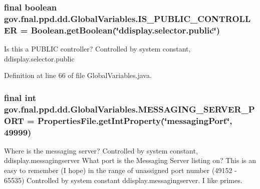 \hypertarget{classgov_1_1fnal_1_1ppd_1_1dd_1_1GlobalVariables_a01fec82f5b2996d3e0c41c1f52d884a0}{
\subsubsection[{I\-S\-\_\-\-P\-U\-B\-L\-I\-C\-\_\-\-C\-O\-N\-T\-R\-O\-L\-L\-E\-R}]{\setlength{\rightskip}{0pt plus 5cm}final boolean gov.\-fnal.\-ppd.\-dd.\-Global\-Variables.\-I\-S\-\_\-\-P\-U\-B\-L\-I\-C\-\_\-\-C\-O\-N\-T\-R\-O\-L\-L\-E\-R = Boolean.\-get\-Boolean(\char`\"{}ddisplay.\-selector.\-public\char`\"{})\hspace{0.3cm}{\ttfamily [static]}}}\label{classgov_1_1fnal_1_1ppd_1_1dd_1_1GlobalVariables_a01fec82f5b2996d3e0c41c1f52d884a0}
Is this a P\-U\-B\-L\-I\-C controller? Controlled by system constant, ddisplay.\-selector.\-public 

Definition at line 66 of file Global\-Variables.\-java.

\hypertarget{classgov_1_1fnal_1_1ppd_1_1dd_1_1GlobalVariables_a3afb8f4fd1dbbc82329ea9ff4aa3629e}{
\subsubsection[{M\-E\-S\-S\-A\-G\-I\-N\-G\-\_\-\-S\-E\-R\-V\-E\-R\-\_\-\-P\-O\-R\-T}]{\setlength{\rightskip}{0pt plus 5cm}final int gov.\-fnal.\-ppd.\-dd.\-Global\-Variables.\-M\-E\-S\-S\-A\-G\-I\-N\-G\-\_\-\-S\-E\-R\-V\-E\-R\-\_\-\-P\-O\-R\-T = {\bf Properties\-File.\-get\-Int\-Property}(\char`\"{}messaging\-Port\char`\"{}, 49999)\hspace{0.3cm}{\ttfamily [static]}}}\label{classgov_1_1fnal_1_1ppd_1_1dd_1_1GlobalVariables_a3afb8f4fd1dbbc82329ea9ff4aa3629e}
Where is the messaging server? Controlled by system constant, ddisplay.\-messagingserver What port is the Messaging Server listing on? This is an easy to remember (I hope) in the range of unassigned port number (49152 -\/ 65535) Controlled by system constant ddisplay.\-messagingserver. I like primes. 

